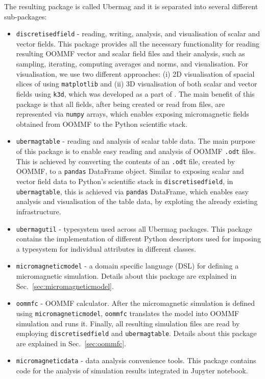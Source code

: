 \documentclass{deliverablereport}
\begin{document}
The resulting package is called Ubermag and it is separated into
several different sub-packages:

\begin{itemize}
\item \texttt{discretisedfield} - reading, writing, analysis, and
visualisation of scalar and vector fields. This package provides all
the necessary functionality for reading resulting OOMMF vector and
scalar field files and their analysis, such as sampling, iterating,
computing averages and norms, and visualisation. For visualisation, we
use two different approaches: (i) 2D visualisation of spacial slices
of using \texttt{matplotlib} and (ii) 3D visualisation of both scalar
and vector fields using \texttt{k3d}, which was developed as a part of
\ODK. The main benefit of this package is that all fields, after being
created or read from files, are represented via \texttt{numpy} arrays,
which enables exposing micromagnetic fields obtained from OOMMF to the
Python scientific stack.
\item \texttt{ubermagtable} - reading and analysis of scalar table
data. The main purpose of this package is to enable easy reading and
analysis of OOMMF \texttt{.odt} files. This is achieved by converting
the contents of an \texttt{.odt} file, created by OOMMF, to a
\texttt{pandas} DataFrame object. Similar to exposing scalar and
vector field data to Python's scientific stack in
\texttt{discretisedfield}, in \texttt{ubermagtable}, this is achieved
via \texttt{pandas} DataFrame, which enables easy analysis and
visualisation of the table data, by exploting the already existing
infrastructure.
\item \texttt{ubermagutil} - typesystem used across all Ubermag
packages. This package contains the implementation of different Python
descriptors used for imposing a typesystem for individual attributes
in different classes.
\item \texttt{micromagneticmodel} - a domain specific language (DSL)
for defining a micromagnetic simulation. Details about this package
are explained in Sec.~\ref{sec:micromagneticmodel}.
\item \texttt{oommfc} - OOMMF calculator. After the micromagnetic
simulation is defined using \texttt{micromagneticmodel},
\texttt{oommfc} translates the model into OOMMF simulation and runs
it. Finally, all resulting simulation files are read by employing
\texttt{discretisedfield} and \texttt{ubermagtable}. Details about
this package are explained in Sec.~\ref{sec:oommfc}.
\item \texttt{micromagneticdata} - data analysis convenience
tools. This package contains code for the analysis of simulation
results integrated in Jupyter notebook.
\end{itemize}
\end{document}
